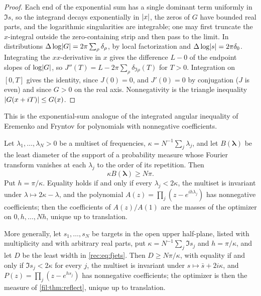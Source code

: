 \begin{proof}
Each end of the exponential sum has a single dominant term uniformly in $\Im s$, so the integrand decays
exponentially in $\lvert x\rvert$, the zeros of $G$ have bounded real parts, and the logarithmic singularities are
integrable; one may first truncate the $x$-integral outside the zero-containing strip and then pass to the
limit. In distributions $\Delta\log\lvert G\rvert=2\pi\sum_\rho\delta_\rho$, by local factorization and
$\Delta\log\lvert s\rvert=2\pi\delta_0$. Integrating the $xx$-derivative in $x$ gives the difference $L-0$ of the
endpoint slopes of $\log\lvert G\rvert$, so $J''(T)=L-2\pi\sum_\rho\delta_{\Im\rho}(T)$ for $T>0$. Integration on
$[0,T]$ gives the identity, since $J(0)=0$, and $J'(0)=0$ by conjugation ($J$ is even) and since $G>0$ on
the real axis. Nonnegativity is the triangle inequality $\lvert G(x+iT)\rvert\le G(x)$.
\end{proof}

This is the exponential-sum analogue of the integrated angular inequality of Eremenko and Fryntov
\cite[Thm.~1]{EremenkoFryntov2016Remarks} for polynomials with nonnegative coefficients.

\begin{theorem}\label{fil:thm:meanbound}
Let $\lambda_1,\dots,\lambda_N>0$ be a multiset of frequencies, $\kappa=N^{-1}\sum_j\lambda_j$, and let
$B(\boldsymbol\lambda)$ be the least diameter of the support of a probability measure whose Fourier
transform vanishes at each $\lambda_j$ to the order of its repetition. Then
\[
 \kappa B(\boldsymbol\lambda)\ge N\pi .
\]
Put $h=\pi/\kappa$. Equality holds if and only if every $\lambda_j<2\kappa$, the multiset is invariant under
$\lambda\mapsto2\kappa-\lambda$, and the polynomial $A(z)=\prod_j(z-e^{ih\lambda_j})$ has nonnegative
coefficients; then the coefficients of $A(z)/A(1)$ are the masses of the optimizer on $0,h,\dots,Nh$, unique
up to translation.

More generally, let $s_1,\dots,s_N$ be targets in the open upper half-plane, listed with multiplicity and
with arbitrary real parts, put $\kappa=N^{-1}\sum_j\Im s_j$ and $h=\pi/\kappa$, and let $D$ be the least
width in \eqref{rec:eq:fjets}. Then $D\ge N\pi/\kappa$, with equality if and only if $\Im s_j<2\kappa$ for
every $j$, the multiset is invariant under $s\mapsto\bar s+2i\kappa$, and $P(z)=\prod_j(z-e^{hs_j})$ has
nonnegative coefficients; the optimizer is then the measure of \cref{fil:thm:reflect}, unique up to
translation.
\end{theorem}


